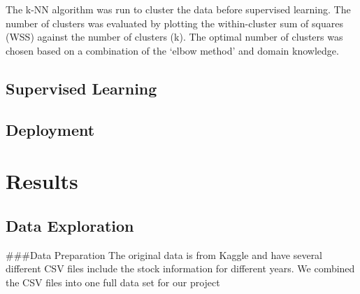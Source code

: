 \documentclass[11pt,]{article}
\begin{document}
The k-NN algorithm was run to cluster the data before supervised
learning. The number of clusters was evaluated by plotting the
within-cluster sum of squares (WSS) against the number of clusters (k).
The optimal number of clusters was chosen based on a combination of the
`elbow method' and domain knowledge.

\hypertarget{supervised-learning}{%
\subsection{Supervised Learning}\label{supervised-learning}}

\hypertarget{deployment}{%
\subsection{Deployment}\label{deployment}}

\hypertarget{results}{%
\section{Results}\label{results}}

\hypertarget{data-exploration}{%
\subsection{Data Exploration}\label{data-exploration}}

\#\#\#Data Preparation The original data is from Kaggle and have several
different CSV files include the stock information for different years.
We combined the CSV files into one full data set for our project
\end{document}
